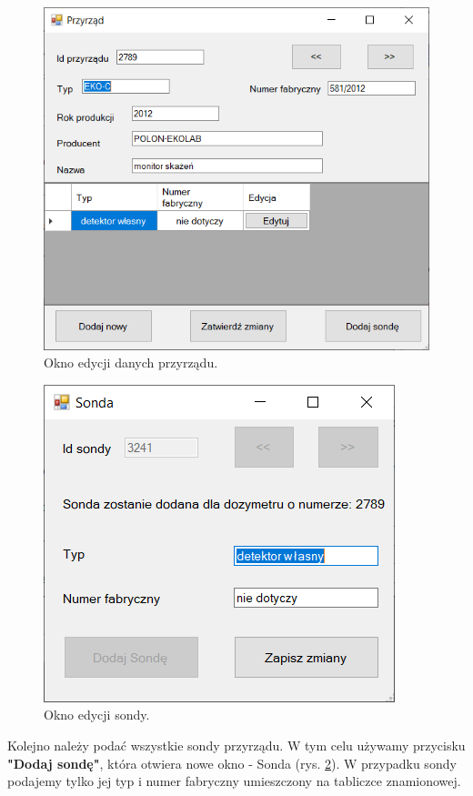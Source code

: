 \begin{figure}[htb]
	\centering
	\includegraphics{obrazki/Biuro/karta/edytuj_przyrzad.png}
	\caption{Okno edycji danych przyrządu.}
	\label{edytujPrzyrzad}
\end{figure}

\begin{figure}[H]
	\centering
	\includegraphics{obrazki/Biuro/karta/edytuj_sonde.png}
	\caption{Okno edycji sondy.}
	\label{edytujSonde}
\end{figure}

Kolejno należy podać wszystkie sondy przyrządu. W tym celu używamy przycisku \textbf{"Dodaj sondę"}, która otwiera nowe okno - Sonda (rys. \ref{edytujSonde}). W przypadku sondy podajemy tylko jej typ i numer fabryczny umieszczony na tabliczce znamionowej.

